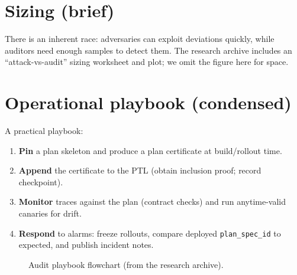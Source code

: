 \documentclass[11pt]{article}
\begin{document}
\section{Sizing (brief)}
There is an inherent race: adversaries can exploit deviations quickly, while auditors need enough samples to detect them.
The research archive includes an ``attack-vs-audit'' sizing worksheet and plot; we omit the figure here for space.


\section{Operational playbook (condensed)}
A practical playbook:
\begin{enumerate}[leftmargin=*]
  \item \textbf{Pin} a plan skeleton and produce a plan certificate at build/rollout time.
  \item \textbf{Append} the certificate to the PTL (obtain inclusion proof; record checkpoint).
  \item \textbf{Monitor} traces against the plan (contract checks) and run anytime-valid canaries for drift.
  \item \textbf{Respond} to alarms: freeze rollouts, compare deployed \texttt{plan\_spec\_id} to expected, and publish incident notes.
\end{enumerate}

\begin{figure}[t]
  \centering
  \caption{Audit playbook flowchart (from the research archive).}
  \label{fig:playbook}
\end{figure}
\end{document}
